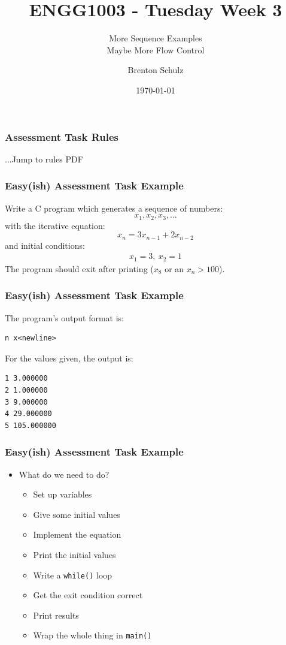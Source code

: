 \documentclass[14pt]{beamer}
\title{ENGG1003 - Tuesday Week 3}
\subtitle{More Sequence Examples\\Maybe More Flow Control}
\author{Brenton Schulz}
\institute{University of Newcastle}
\date{\today}
\begin{document}
\titlepage


\begin{frame}
\frametitle{Assessment Task Rules}
\begin{center}
...Jump to rules PDF
\end{center}
\end{frame}

\begin{frame}
\frametitle{Easy(ish) Assessment Task Example}
{\small Write a C program which generates a sequence of numbers:
\begin{equation*}
x_1, x_2, x_3, ...
\end{equation*}
with the iterative equation:
\begin{equation*}
x_n = 3x_{n-1} + 2x_{n-2}
\end{equation*}
and initial conditions:
\begin{align*}
x_1 = 3,~ x_2 = 1
\end{align*}
The program should exit after printing ($x_8$ or an $x_n > 100$).
}
\end{frame}

\begin{frame}[fragile]
\frametitle{Easy(ish) Assessment Task Example}
The program's output format is:
\begin{lstlisting}[style=pseudo]
n x<newline>
\end{lstlisting}
For the values given, the output is:
\begin{lstlisting}[style=pseudo]
1 3.000000
2 1.000000
3 9.000000
4 29.000000
5 105.000000
\end{lstlisting}
\end{frame}

\begin{frame}
\frametitle{Easy(ish) Assessment Task Example}
\begin{itemize}
\item What do we need to do?
	\begin{itemize}
		\item Set up variables
		\item Give some initial values
		\item Implement the equation
		\item Print the initial values
		\item Write a \texttt{while()} loop
		\item Get the exit condition correct
		\item Print results
		\item Wrap the whole thing in \texttt{main()}
	\end{itemize}
\end{itemize}
\end{frame}
\end{document}
